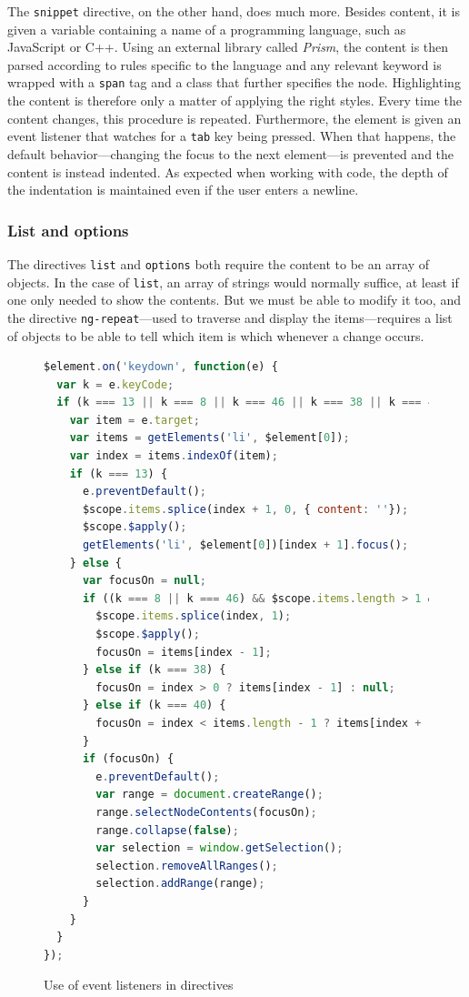 \documentclass[thesis=M,english,hidelinks]{FITthesis}[2012/10/20]
\newcommand{\code}{\texttt}
\begin{document}
The \code{snippet} directive, on the other hand, does much more. Besides content, it is given a variable containing a name of a programming language, such as JavaScript or C++. Using an external library called \textit{Prism}, the content is then parsed according to rules specific to the language and any relevant keyword is wrapped with a \code{span} tag and a class that further specifies the node. Highlighting the content is therefore only a matter of applying the right styles. Every time the content changes, this procedure is repeated. Furthermore, the element is given an event listener that watches for a \code{tab} key being pressed. When that happens, the default behavior---changing the focus to the next element---is prevented and the content is instead indented. As expected when working with code, the depth of the indentation is maintained even if the user enters a newline.

      \subsubsection{List and options}

The directives \code{list} and \code{options} both require the content to be an array of objects. In the case of \code{list}, an array of strings would normally suffice, at least if one only needed to show the contents. But we must be able to modify it too, and the directive \code{ng-repeat}---used to traverse and display the items---requires a list of objects to be able to tell which item is which whenever a change occurs.

\begin{figure}
  \begin{lstlisting}[language=JavaScript]
$element.on('keydown', function(e) {
  var k = e.keyCode;
  if (k === 13 || k === 8 || k === 46 || k === 38 || k === 40) {
    var item = e.target;
    var items = getElements('li', $element[0]);
    var index = items.indexOf(item);
    if (k === 13) {
      e.preventDefault();
      $scope.items.splice(index + 1, 0, { content: ''});
      $scope.$apply();
      getElements('li', $element[0])[index + 1].focus();
    } else {
      var focusOn = null;
      if ((k === 8 || k === 46) && $scope.items.length > 1 && !$scope.items[index].content) {
        $scope.items.splice(index, 1);
        $scope.$apply();
        focusOn = items[index - 1];
      } else if (k === 38) {
        focusOn = index > 0 ? items[index - 1] : null;
      } else if (k === 40) {
        focusOn = index < items.length - 1 ? items[index + 1] : null;
      }
      if (focusOn) {
        e.preventDefault();
        var range = document.createRange();
        range.selectNodeContents(focusOn);
        range.collapse(false);
        var selection = window.getSelection();
        selection.removeAllRanges();
        selection.addRange(range);
      }
    }
  }
});
  \end{lstlisting}
  \caption{Use of event listeners in directives}
  \label{fig:list_directive}
\end{figure}
\end{document}
